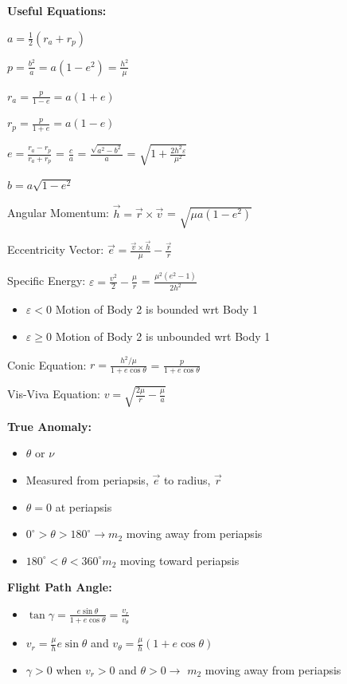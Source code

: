 \documentclass{article}
\begin{document}
\begin{multicols*}{3}
    \textbf{Useful Equations:}\par
    $a = \frac{1}{2}(r_a+r_p)$\par 
    $p=\frac{b^2}{a}=a(1-e^2)=\frac{h^2}{\mu}$\par 
    $r_a = \frac{p}{1-e}=a(1+e)$\par 
    $r_p = \frac{p}{1+e}=a(1-e)$\par
    $e = \frac{r_a-r_p}{r_a+r_p}$ = $\frac{c}{a}$ = $\frac{\sqrt{a^2-b^2}}{a}$ = $\sqrt{1+\frac{2h^2\varepsilon}{\mu^2}}$\par 
    $b = a\sqrt{1-e^2}$ \par
    Angular Momentum: $\vec{h} = \vec{r} \times \vec{v}$ = $\sqrt{\mu a (1-e^2)}$ \par
    Eccentricity Vector: $\vec{e} = \frac{\vec{v} \times \vec{h}}{\mu}-\frac{\vec{r}}{r}$\par
    Specific Energy: $\varepsilon = \frac{v^2}{2}-\frac{\mu}{r}$ = $\frac{\mu^2(e^2-1)}{2h^2}$\par
    \begin{itemize}
        \itemsep0em
        \item $\varepsilon < 0$ Motion of Body 2 is bounded wrt Body 1
        \item $\varepsilon \ge 0$ Motion of Body 2 is unbounded wrt Body 1
    \end{itemize}
    Conic Equation: $r = \frac{h^2/\mu}{1+e\cos{\theta}}$ = $\frac{p}{1+e\cos{\theta}}$\par 
    Vis-Viva Equation: $v=\sqrt{\frac{2\mu}{r}-\frac{\mu}{a}}$\par
    \textbf{True Anomaly:} 
    \begin{itemize}
        \itemsep0em
        \item $\theta$ or $\nu$
        \item Measured from periapsis, $\vec{e}$ to radius, $\vec{r}$
        \item $\theta = 0$ at periapsis
        \item $0^\circ > \theta > 180^\circ \rightarrow m_2$ moving away from periapsis
        \item $180^\circ < \theta < 360^\circ m_2$ moving toward periapsis
    \end{itemize}
    \textbf{Flight Path Angle:} 
    \begin{itemize}
        \itemsep0em
        \item $\tan{\gamma} = \frac{e\sin{\theta}}{1+e\cos{\theta}} = \frac{v_r}{v_{\theta}}$
        \item $v_r = \frac{\mu}{h}e\sin{\theta}$ and $v_\theta = \frac{\mu}{h}(1+e\cos{\theta})$
        \item $\gamma > 0$ when $v_r>0$ and $\theta>0\rightarrow$ $m_2$ moving away from periapsis
    \end{itemize}
     

\end{multicols*}
\end{document}
